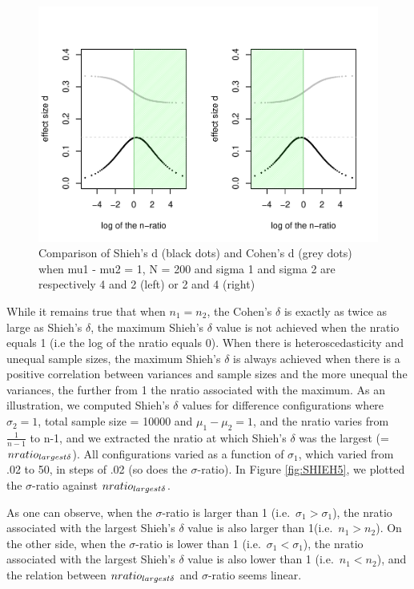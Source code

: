 \documentclass[man,floatsintext]{apa6}
\begin{document}
\begin{figure}
\centering
\includegraphics{The-shieh-s-and-its-relation-with-Cohen-s-d_files/figure-latex/SHIEH4-1.pdf}
\caption{\label{fig:SHIEH4}Comparison of Shieh's d (black dots) and Cohen's d (grey dots) when mu1 - mu2 = 1, N = 200 and sigma 1 and sigma 2 are respectively 4 and 2 (left) or 2 and 4 (right)}
\end{figure}

While it remains true that when \(n_{1}=n_{2}\), the Cohen's \(\delta\) is exactly as twice as large as Shieh's \(\delta\), the maximum Shieh's \(\delta\) value is not achieved when the nratio equals 1 (i.e the log of the nratio equals 0). When there is heteroscedasticity and unequal sample sizes, the maximum Shieh's \(\delta\) is always achieved when there is a positive correlation between variances and sample sizes and the more unequal the variances, the further from 1 the nratio associated with the maximum. As an illustration, we computed Shieh's \(\delta\) values for difference configurations where \(\sigma_{2}=1\), total sample size = 10000 and \(\mu_{1}-\mu_{2}=1\), and the nratio varies from \(\frac{1}{n-1}\) to n-1, and we extracted the nratio at which Shieh's \(\delta\) was the largest (=\(nratio_{largest \space \delta}\)). All configurations varied as a function of \(\sigma_{1}\), which varied from .02 to 50, in steps of .02 (so does the \(\sigma\)-ratio). In Figure \ref{fig:SHIEH5}, we plotted the \(\sigma\)-ratio against \(nratio_{largest \space \delta}\).

As one can observe, when the \(\sigma\)-ratio is larger than 1 (i.e.~\(\sigma_{1} > \sigma_{1}\)), the nratio associated with the largest Shieh's \(\delta\) value is also larger than 1(i.e.~\(n_{1} > n_{2}\)). On the other side, when the \(\sigma\)-ratio is lower than 1 (i.e.~\(\sigma_{1} < \sigma_{1}\)), the nratio associated with the largest Shieh's \(\delta\) value is also lower than 1 (i.e.~\(n_{1} < n_{2}\)), and the relation between \(nratio_{largest \space \delta}\) and \(\sigma\)-ratio seems linear.
\end{document}
